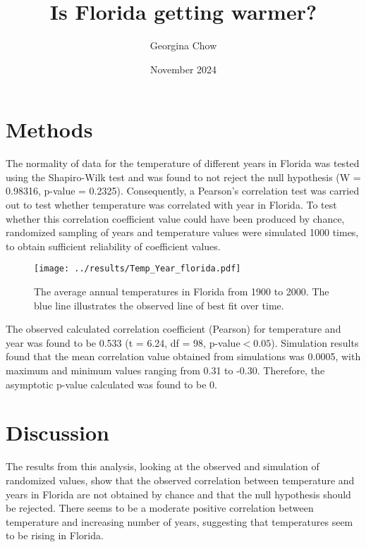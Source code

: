 \documentclass{article}
\title{Is Florida getting warmer?}
\author{Georgina Chow}
\date{November 2024}
\begin{document}
\maketitle
  

  \section*{Methods}
  The normality of data for the temperature of different years in Florida was tested using the 
  Shapiro-Wilk test and was found to not reject the null hypothesis (W = 0.98316, p-value = 0.2325).
  Consequently, a Pearson's correlation test was carried out to test whether temperature was correlated
  with year in Florida. To test whether this correlation coefficient value could have been produced by chance,
  randomized sampling of years and temperature values were simulated 1000 times, to obtain sufficient reliability 
  of coefficient values.

  \begin{figure}[h!]
    \centering
    \texttt{[image: ../results/Temp\_Year\_florida.pdf]}    
    \caption{The average annual temperatures in Florida from 1900 to 2000. The blue line illustrates the observed line of best fit over time.}
    \label{fig1}
  \end{figure}

    The observed calculated correlation coefficient (Pearson) for temperature and year was found to be 
    0.533 (t = 6.24, df = 98, p-value$<0.05$). Simulation results found that the mean correlation value obtained
    from simulations was 0.0005, with maximum and minimum values ranging from 0.31 to -0.30. Therefore, the 
    asymptotic p-value calculated was found to be 0. 

    \section*{Discussion}
    The results from this analysis, looking at the observed and simulation of randomized values, 
    show that the observed correlation between temperature and years in Florida are not obtained by chance 
    and that the null hypothesis should be rejected. There seems to be a moderate positive correlation between 
    temperature and increasing number of years, suggesting that temperatures seem to be rising in Florida.
\end{document}
